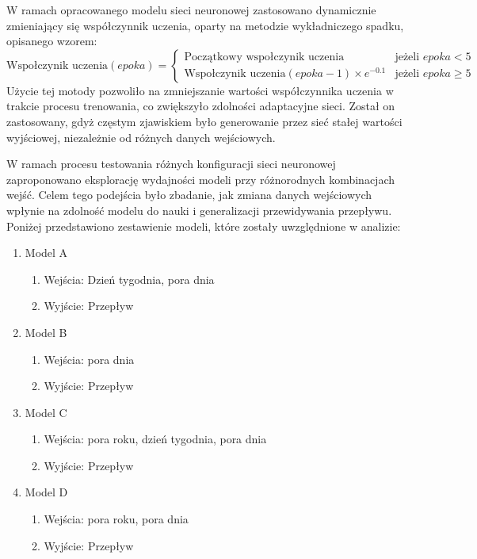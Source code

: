 \documentclass[a4paper,twoside,12pt]{book}
\begin{document}
W ramach opracowanego modelu sieci neuronowej zastosowano dynamicznie zmieniający się współczynnik uczenia, oparty na metodzie wykładniczego spadku, opisanego wzorem:
\begin{equation}
  \text{Wspołczynik uczenia}(epoka) =
  \begin{cases}
    \text{Początkowy wspołczynik uczenia}                 & \text{jeżeli } epoka < 5    \\
    \text{Wspołczynik uczenia}(epoka - 1) \times e^{-0.1} & \text{jeżeli } epoka \geq 5
  \end{cases}
\end{equation}
Użycie tej motody pozwoliło na zmniejszanie wartości współczynnika uczenia w trakcie procesu trenowania, co zwiększyło zdolności adaptacyjne sieci. Został on zastosowany, gdyż częstym zjawiskiem było generowanie przez sieć stałej wartości wyjściowej, niezależnie od różnych danych wejściowych.

W ramach procesu testowania różnych konfiguracji sieci neuronowej zaproponowano eksplorację wydajności modeli przy różnorodnych kombinacjach wejść. Celem tego podejścia było zbadanie, jak zmiana danych wejściowych wpłynie na zdolność modelu do nauki i generalizacji przewidywania przepływu. Poniżej przedstawiono zestawienie modeli, które zostały uwzględnione w analizie:

\begin{enumerate}
  \item Model A
        \begin{enumerate}
          \item Wejścia: Dzień tygodnia, pora dnia
          \item Wyjście: Przepływ
        \end{enumerate}
  \item Model B
        \begin{enumerate}
          \item Wejścia: pora dnia
          \item Wyjście: Przepływ
        \end{enumerate}
  \item Model C
        \begin{enumerate}
          \item Wejścia: pora roku, dzień tygodnia, pora dnia
          \item Wyjście: Przepływ
        \end{enumerate}
  \item Model D
        \begin{enumerate}
          \item Wejścia: pora roku, pora dnia
          \item Wyjście: Przepływ
        \end{enumerate}
\end{enumerate}
\end{document}
